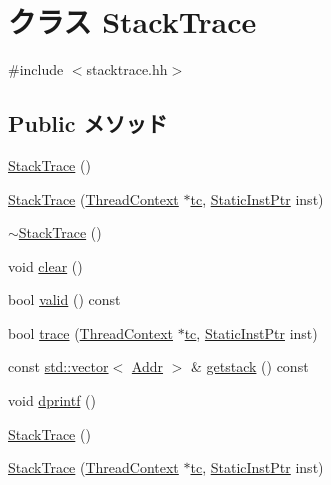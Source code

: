 \hypertarget{classMipsISA_1_1StackTrace}{
\section{クラス StackTrace}
\label{classMipsISA_1_1StackTrace}
}


{\ttfamily \#include $<$stacktrace.hh$>$}\subsection*{Public メソッド}
\begin{DoxyCompactItemize}
\item 
\hyperlink{classMipsISA_1_1StackTrace_a5a9b2e3bba2262e73b20f87325efd063}{StackTrace} ()
\item 
\hyperlink{classMipsISA_1_1StackTrace_a7c751415d8c87372fc7d24513309cf1b}{StackTrace} (\hyperlink{classThreadContext}{ThreadContext} $\ast$\hyperlink{classMipsISA_1_1StackTrace_a7d1b4bb6199b71a875f0eb5d9c19022b}{tc}, \hyperlink{classRefCountingPtr}{StaticInstPtr} inst)
\item 
\hyperlink{classMipsISA_1_1StackTrace_adec953886bb73db4f2ec91ed12810135}{$\sim$StackTrace} ()
\item 
void \hyperlink{classMipsISA_1_1StackTrace_ac8bb3912a3ce86b15842e79d0b421204}{clear} ()
\item 
bool \hyperlink{classMipsISA_1_1StackTrace_a8d985300b138b6c5556ab17ed4df3b38}{valid} () const 
\item 
bool \hyperlink{classMipsISA_1_1StackTrace_aabb136846a5e22007e44db846652ddd5}{trace} (\hyperlink{classThreadContext}{ThreadContext} $\ast$\hyperlink{classMipsISA_1_1StackTrace_a7d1b4bb6199b71a875f0eb5d9c19022b}{tc}, \hyperlink{classRefCountingPtr}{StaticInstPtr} inst)
\item 
const \hyperlink{classstd_1_1vector}{std::vector}$<$ \hyperlink{classm5_1_1params_1_1Addr}{Addr} $>$ \& \hyperlink{classMipsISA_1_1StackTrace_aceb93ba31a3756aca859b4643efeeb46}{getstack} () const 
\item 
void \hyperlink{classMipsISA_1_1StackTrace_a70fdc8802b54b4244889a2d3553405d5}{dprintf} ()
\item 
\hyperlink{classMipsISA_1_1StackTrace_a5a9b2e3bba2262e73b20f87325efd063}{StackTrace} ()
\item 
\hyperlink{classMipsISA_1_1StackTrace_a7c751415d8c87372fc7d24513309cf1b}{StackTrace} (\hyperlink{classThreadContext}{ThreadContext} $\ast$\hyperlink{classMipsISA_1_1StackTrace_a7d1b4bb6199b71a875f0eb5d9c19022b}{tc}, \hyperlink{classRefCountingPtr}{StaticInstPtr} inst)

\end{DoxyCompactItemize}
